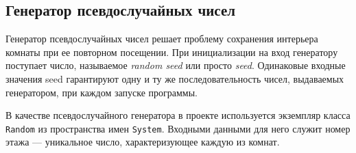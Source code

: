 \subsection{Генератор псевдослучайных чисел}

Генератор псевдослучайных чисел решает проблему сохранения интерьера комнаты при ее повторном посещении. При инициализации на вход генератору поступает число, называемое \textit{random seed} или просто \textit{seed}. Одинаковые входные значения seed гарантируют одну и ту же последовательность чисел, выдаваемых генератором, при каждом запуске программы. 

В качестве псевдослучайного генератора в проекте используется экземпляр класса \texttt{Random} из пространства имен \texttt{System}. Входными данными для него служит номер этажа --- уникальное число, характеризующее каждую из комнат.
 